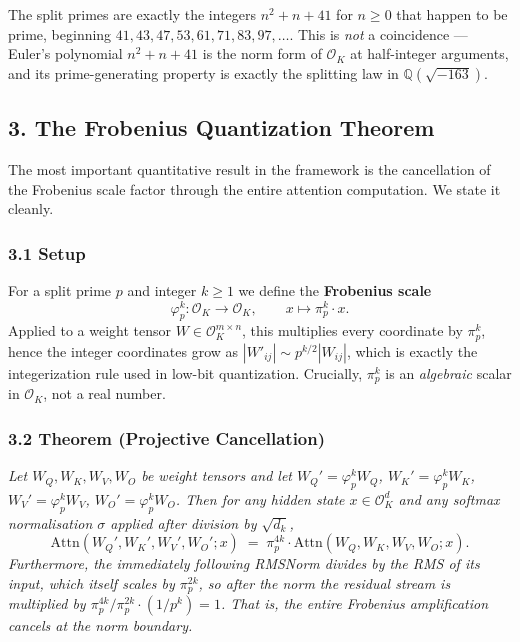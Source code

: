 \documentclass[
  11pt,
]{article}
\begin{document}
The split primes are exactly the integers \(n^2 + n + 41\) for
\(n \ge 0\) that happen to be prime, beginning
\(41, 43, 47, 53, 61, 71, 83, 97, \dots\). This is \emph{not} a
coincidence --- Euler's polynomial \(n^2 + n + 41\) is the norm form of
\(\mathcal{O}_K\) at half-integer arguments, and its prime-generating
property is exactly the splitting law in \(\mathbb{Q}(\sqrt{-163})\).

\hypertarget{the-frobenius-quantization-theorem}{%
\subsection{3. The Frobenius Quantization
Theorem}\label{the-frobenius-quantization-theorem}}

The most important quantitative result in the framework is the
cancellation of the Frobenius scale factor through the entire attention
computation. We state it cleanly.

\hypertarget{setup}{%
\subsubsection{3.1 Setup}\label{setup}}

For a split prime \(p\) and integer \(k \ge 1\) we define the
\textbf{Frobenius scale}
\[\varphi_p^k : \mathcal{O}_K \to \mathcal{O}_K, \qquad x \mapsto \pi_p^k \cdot x.\]
Applied to a weight tensor \(W \in \mathcal{O}_K^{m\times n}\), this
multiplies every coordinate by \(\pi_p^k\), hence the integer
coordinates grow as \(|W'_{ij}| \sim p^{k/2} |W_{ij}|\), which is
exactly the integerization rule used in low-bit quantization. Crucially,
\(\pi_p^k\) is an \emph{algebraic} scalar in \(\mathcal{O}_K\), not a
real number.

\hypertarget{theorem-projective-cancellation}{%
\subsubsection{3.2 Theorem (Projective
Cancellation)}\label{theorem-projective-cancellation}}

\emph{Let \(W_Q, W_K, W_V, W_O\) be weight tensors and let
\(W_Q' = \varphi_p^k W_Q\), \(W_K' = \varphi_p^k W_K\),
\(W_V' = \varphi_p^k W_V\), \(W_O' = \varphi_p^k W_O\). Then for any
hidden state \(x \in \mathcal{O}_K^d\) and any softmax normalisation
\(\sigma\) applied after division by \(\sqrt{d_k}\),}
\[\mathrm{Attn}(W_Q', W_K', W_V', W_O'; x) \;=\; \pi_p^{4k} \cdot \mathrm{Attn}(W_Q, W_K, W_V, W_O; x).\]
\emph{Furthermore, the immediately following RMSNorm divides by the RMS
of its input, which itself scales by \(\pi_p^{2k}\), so after the norm
the residual stream is multiplied by
\(\pi_p^{4k} / \pi_p^{2k} \cdot (1/p^{k}) = 1\). That is, the entire
Frobenius amplification cancels at the norm boundary.}
\end{document}
